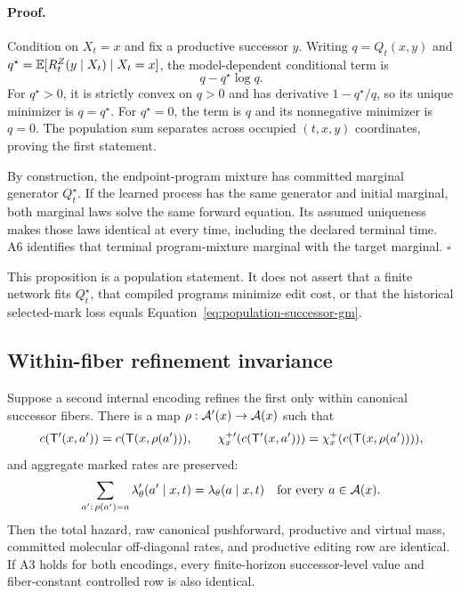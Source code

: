 \paragraph{Proof.}
Condition on $X_t=x$ and fix a productive successor $y$. Writing
$q=Q_t(x,y)$ and
$q^\star=\mathbb{E}[R_t^Z(y\mid X_t)\mid X_t=x]$, the model-dependent conditional
term is
\[
  q-q^\star\log q.
\]
For $q^\star>0$, it is strictly convex on $q>0$ and has derivative
$1-q^\star/q$, so its unique minimizer is $q=q^\star$. For
$q^\star=0$, the term is $q$ and its nonnegative minimizer is $q=0$.
The population sum separates across occupied $(t,x,y)$ coordinates, proving
the first statement.

By construction, the endpoint-program mixture has committed marginal
generator $Q_t^\star$. If the learned process has the same generator and
initial marginal, both marginal laws solve the same forward equation. Its
assumed uniqueness makes those laws identical at every time, including the
declared terminal time. A6 identifies that terminal program-mixture marginal
with the target marginal.
\hfill$\square$

This proposition is a population statement. It does not assert that a finite
network fits $Q_t^\star$, that compiled programs minimize edit cost, or that
the historical selected-mark loss equals
Equation~\eqref{eq:population-successor-gm}.

\subsection{Within-fiber refinement invariance}
\label{sec:app-compose-refinement-proof}

\begin{composeappendixproposition}
\label{prop:app-compose-refinement}
Suppose a second internal encoding refines the first only within canonical
successor fibers. There is a map $\rho:\mathcal{A}'(x)\to\mathcal{A}(x)$ such that
\[
c(\mathsf{T}'(x,a'))=c(\mathsf{T}(x,\rho(a'))),
\qquad
\chi_x^{+\prime}(c(\mathsf{T}'(x,a')))
=
\chi_x^+(c(\mathsf{T}(x,\rho(a')))),
\]
and aggregate marked rates are preserved:
\[
  \sum_{a':\,\rho(a')=a}\lambda'_\theta(a'\mid x,t)
  =
  \lambda_\theta(a\mid x,t)
  \quad\text{for every }a\in\mathcal{A}(x).
\]
Then the total hazard, raw canonical pushforward, productive and virtual
mass, committed molecular off-diagonal rates, and productive editing row are
identical. If A3 holds for both encodings, every finite-horizon
successor-level value and fiber-constant controlled row is also identical.
\end{composeappendixproposition}

